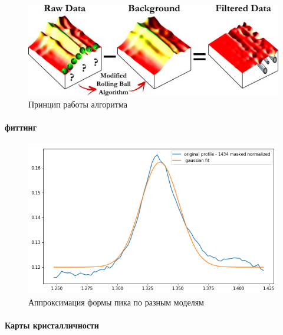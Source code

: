 	\begin{figure}
    \includegraphics[width=\textwidth]{fig/rolling-ball.jpg}
    \caption{Принцип работы алгоритма}
    \label{fig:rolling-ball}
\end{figure}

    \paragraph{фиттинг}

\begin{figure}
    \centering
    \includegraphics[width=\linewidth]{fig/gauss-fit.png}
    \caption{Аппроксимация формы пика по разным моделям}
    \label{fig:my_label}
\end{figure}
	
	\paragraph{Карты кристалличности}
	
